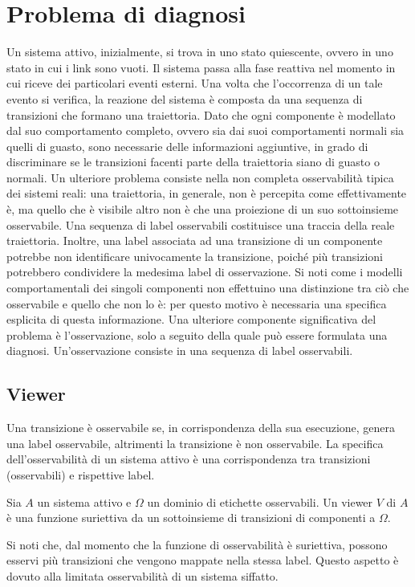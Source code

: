 \section{Problema di diagnosi}
Un sistema attivo, inizialmente, si trova in uno stato quiescente, ovvero in uno stato in cui i link sono vuoti. Il sistema passa alla fase reattiva nel momento in cui riceve dei particolari eventi esterni. Una volta che l'occorrenza di un tale evento si verifica, la reazione del sistema è composta da una sequenza di transizioni che formano una traiettoria. Dato che ogni componente è modellato dal suo comportamento completo, ovvero sia dai suoi comportamenti normali sia quelli di guasto, sono necessarie delle informazioni aggiuntive, in grado di discriminare se le transizioni facenti parte della traiettoria siano di guasto o normali. Un ulteriore problema consiste nella non completa osservabilità tipica dei sistemi reali: una traiettoria, in generale, non è percepita come effettivamente è, ma quello che è visibile altro non è che una proiezione di un suo sottoinsieme osservabile. Una sequenza di label osservabili costituisce una traccia della reale traiettoria. Inoltre, una label associata ad una transizione di un componente potrebbe non identificare univocamente la transizione, poiché più transizioni potrebbero condividere la medesima label di osservazione. Si noti come i modelli comportamentali dei singoli componenti non effettuino una distinzione tra ciò che osservabile e quello che non lo è: per questo motivo è necessaria una specifica esplicita di questa informazione. Una ulteriore componente significativa del problema è l'osservazione, solo a seguito della quale può essere formulata una diagnosi. Un'osservazione consiste in una sequenza di label osservabili.

\subsection{Viewer}
Una transizione è osservabile se, in corrispondenza della sua esecuzione, genera una label osservabile, altrimenti la transizione è non osservabile. La specifica dell'osservabilità di un sistema attivo è una corrispondenza tra transizioni (osservabili) e rispettive label.
\begin{defn}
Sia $A$ un sistema attivo e $\Omega$ un dominio di etichette osservabili. Un viewer $V$ di $A$ è una funzione suriettiva da un sottoinsieme di transizioni di componenti a $\Omega$.
\end{defn}
Si noti che, dal momento che la funzione di osservabilità è suriettiva, possono esservi più transizioni che vengono mappate nella stessa label. Questo aspetto è dovuto alla limitata osservabilità di un sistema siffatto.

